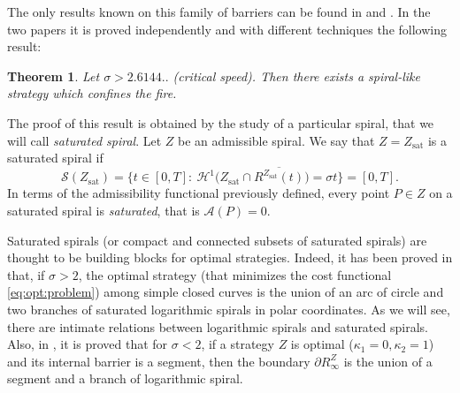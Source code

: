 \documentclass[reqno]{amsart}
\theoremstyle{definition} \newtheorem{definition}{Definition}[section]
\theoremstyle{definition} \newtheorem{remark}[definition]{Remark}
\theoremstyle{plain} \newtheorem{lemma}[definition]{Lemma}
\theoremstyle{plain} \newtheorem{proposition}[definition]{Proposition}
\theoremstyle{plain} \newtheorem{theorem}[definition]{Theorem}
\theoremstyle{plain} \newtheorem{corollary}[definition]{Corollary}
\theoremstyle{definition} \newtheorem{example}[definition]{Example}
\theoremstyle{plain} \newtheorem{claim}[clai]{Claim}
\theoremstyle{definition} \newtheorem{assumption}[definition]{Assumption}
\theoremstyle{definition} \newtheorem{observation}[definition]{Observation}
\newcommand{\1}{\mathbbm 1}
\renewcommand{\H}{\mathscr H}
\numberwithin{equation}{section} %
\theoremstyle{plain} \newtheorem*{theorem*}{Theorem}
\theoremstyle{plain} \newtheorem{mthm}[maintheorem]{Main Theorem}
\theoremstyle{plain} \newtheorem*{mthm*}{Main Theorem}
\theoremstyle{plain} \newtheorem*{conjecture*}{Conjecture}
\theoremstyle{plain} \newtheorem{conjecture}[definition]{Conjecture}
\theoremstyle{plain} \newtheorem*{problem*}{Problem}
\begin{document}
The only results known on this family of barriers can be found in \cite{Bressan_friends} and \cite{firefighter}. In the two papers it is proved independently and with different techniques the following result:

\begin{theorem}
\label{bressan,klein}
Let $\sigma > 2.6144..$ (critical speed). Then there exists a spiral-like strategy which confines the fire.
\end{theorem}

The proof of this result is obtained by the study of a particular spiral, that we will call \emph{saturated spiral}. Let $Z$ be an admissible spiral. We say that $Z=Z_{\text{sat}}$ is a saturated spiral if
\begin{equation*}
\mathcal{S}(Z_{\text{sat}}) = \big\lbrace t \in[0,T]:\ \H^1 \big( Z_{\text{sat}} \cap \overline{R^{Z_{\text{sat}}}(t)}\big) = \sigma t \big\rbrace = [0,T].
\end{equation*}
In terms of the admissibility functional previously defined, every point $P\in Z$ on a saturated spiral is \emph{saturated}, that is $\mathcal{A}(P)=0$.

Saturated spirals (or compact and connected subsets of saturated spirals) are thought to be building blocks for optimal strategies. Indeed, it has been proved in \cite{Bressan_isotropic} that, if $\sigma>2$, the optimal strategy (that minimizes the cost functional \eqref{eq:opt:problem}) among simple closed curves is the union of an arc of circle and two branches of saturated logarithmic spirals in polar coordinates. As we will see, there are intimate relations between logarithmic spirals and saturated spirals. Also, in \cite{FireSegment}, it is proved that for $\sigma<2$, if a strategy $Z$ is optimal ($\kappa_1=0,\kappa_2=1$) and its internal barrier is a segment, then the boundary $\partial R^Z_\infty$ is the union of a segment and a branch of logarithmic spiral.
\end{document}
